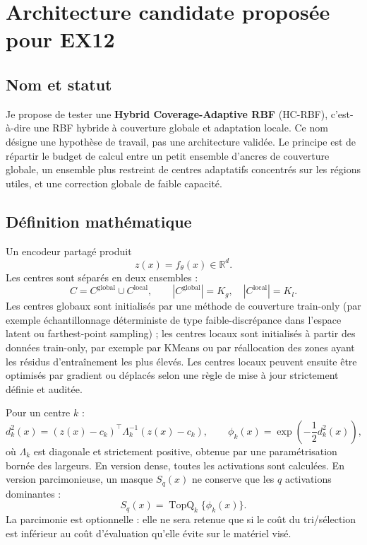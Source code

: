 \documentclass[11pt,a4paper]{article}
\newcommand{\R}{\mathbb{R}}
\newcommand{\HC}{\textsc{HC-RBF}}
\begin{document}
\section{Architecture candidate proposée pour EX12}

\subsection{Nom et statut}

Je propose de tester une \textbf{Hybrid Coverage-Adaptive RBF} (\HC), c'est-à-dire une RBF hybride à couverture globale et adaptation locale. Ce nom désigne une hypothèse de travail, pas une architecture validée. Le principe est de répartir le budget de calcul entre un petit ensemble d'ancres de couverture globale, un ensemble plus restreint de centres adaptatifs concentrés sur les régions utiles, et une correction globale de faible capacité.

\subsection{Définition mathématique}

Un encodeur partagé produit
\[
 z(x)=f_{\theta}(x)\in\R^d.
\]
Les centres sont séparés en deux ensembles :
\[
 C=C^{\mathrm{global}}\cup C^{\mathrm{local}},\qquad
 |C^{\mathrm{global}}|=K_g,\quad |C^{\mathrm{local}}|=K_l.
\]
Les centres globaux sont initialisés par une méthode de couverture train-only (par exemple échantillonnage déterministe de type faible-discrépance dans l'espace latent ou farthest-point sampling) ; les centres locaux sont initialisés à partir des données train-only, par exemple par KMeans ou par réallocation des zones ayant les résidus d'entraînement les plus élevés. Les centres locaux peuvent ensuite être optimisés par gradient ou déplacés selon une règle de mise à jour strictement définie et auditée.

Pour un centre $k$ :
\[
 d_k^2(x)=(z(x)-c_k)^\top\Lambda_k^{-1}(z(x)-c_k),\qquad
 \phi_k(x)=\exp\left(-\frac12d_k^2(x)\right),
\]
où $\Lambda_k$ est diagonale et strictement positive, obtenue par une paramétrisation bornée des largeurs. En version dense, toutes les activations sont calculées. En version parcimonieuse, un masque $S_q(x)$ ne conserve que les $q$ activations dominantes :
\[
 S_q(x)=\operatorname{TopQ}_k\{\phi_k(x)\}.
\]
La parcimonie est optionnelle : elle ne sera retenue que si le coût du tri/sélection est inférieur au coût d'évaluation qu'elle évite sur le matériel visé.
\end{document}
